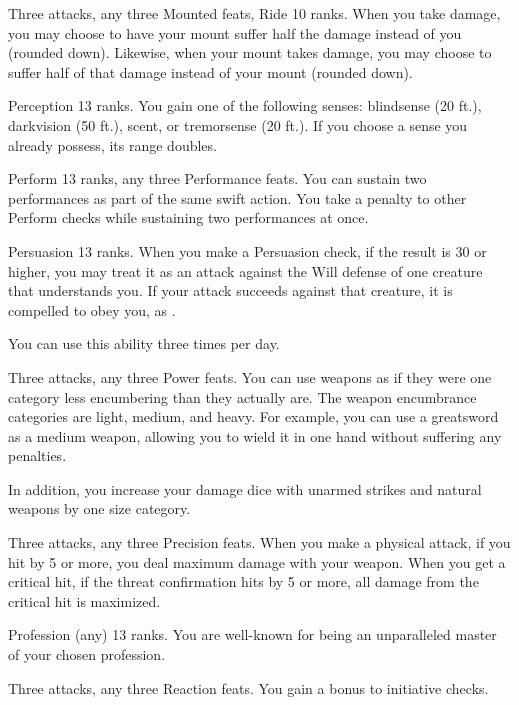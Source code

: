 \featpre Three attacks, any three Mounted feats, Ride 10 ranks.
\featben When you take damage, you may choose to have your mount suffer half the damage instead of you (rounded down).
Likewise, when your mount takes damage, you may choose to suffer half of that damage instead of your mount (rounded down).

\featpre Perception 13 ranks.
\featben You gain one of the following senses: blindsense (20 ft.), darkvision (50 ft.), scent, or tremorsense (20 ft.).
If you choose a sense you already possess, its range doubles.

\featpres Perform 13 ranks, any three Performance feats.
\featben You can sustain two performances as part of the same swift action.
You take a  penalty to other Perform checks while sustaining two performances at once.

\featpres Persuasion 13 ranks.
\featben When you make a Persuasion check, if the result is 30 or higher, you may treat it as an attack against the Will defense of one creature that understands you.
If your attack succeeds against that creature, it is compelled to obey you, as .

You can use this ability three times per day.

\featpres Three attacks, any three Power feats.
\featben You can use weapons as if they were one category less encumbering than they actually are.
The weapon encumbrance categories are light, medium, and heavy.
For example, you can use a greatsword as a medium weapon, allowing you to wield it in one hand without suffering any penalties.

In addition, you increase your damage dice with unarmed strikes and natural weapons by one size category.

\featpre Three attacks, any three Precision feats.
\featben When you make a physical attack, if you hit by 5 or more, you deal maximum damage with your weapon.
When you get a critical hit, if the threat confirmation hits by 5 or more, all damage from the critical hit is maximized.

\featpre Profession (any) 13 ranks.
\featben You are well-known for being an unparalleled master of your chosen profession.

\featpre Three attacks, any three Reaction feats.
\featben You gain a  bonus to initiative checks.

